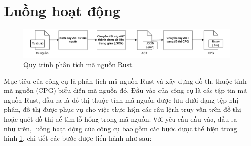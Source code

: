 \section{Luồng hoạt động}

\begin{figure}[H]
	\includegraphics[width=1\columnwidth]{figures/c3/c3_flow_2.drawio.pdf}
	\centering
	\caption{Quy trình phân tích mã nguồn Rust.}
	\label{img:c3_flow_2}
\end{figure}




Mục tiêu của công cụ là phân tích mã nguồn Rust và xây dựng đồ thị thuộc tính mã nguồn (CPG) biểu diễn mã nguồn đó. Đầu vào của công cụ là các tập tin mã nguồn Rust, đầu ra là đồ thị thuộc tính mã nguồn được lưu dưới dạng tệp nhị phân, đồ thị được phục vụ cho việc thực hiện các câu lệnh truy vấn trên đồ thị hoặc quét đồ thị để tìm lỗ hổng trong mã nguồn. Với yêu cầu đầu vào, đầu ra như trên, luồng hoạt động của công cụ bao gồm các bước được thể hiện trong hình \ref{img:c3_flow_2}, chi tiết các bước được tiến hành như sau:

